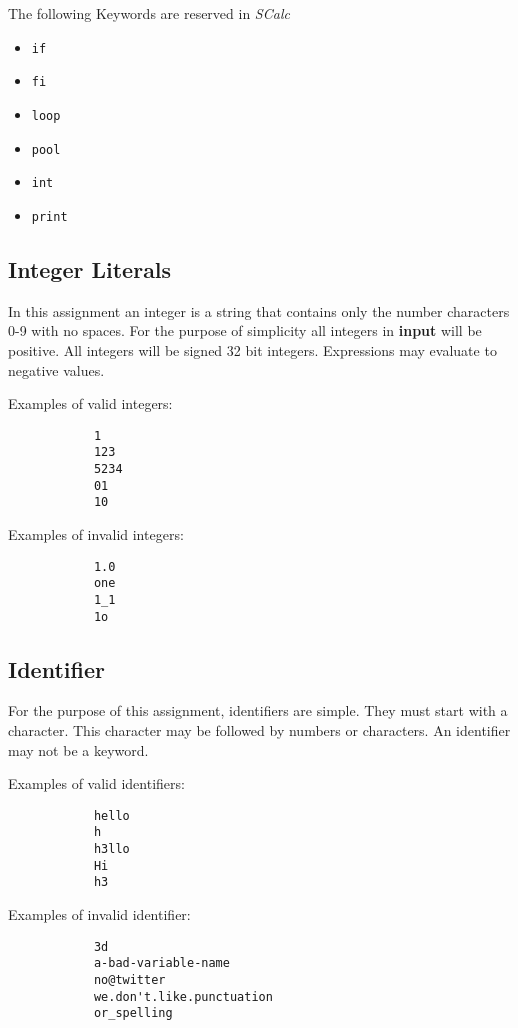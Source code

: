 \documentclass{article}
\newcommand{\code}[1]{\texttt{\textmd{#1}}}
\begin{document}
		The following Keywords are reserved in \textit{SCalc}

		\begin {itemize}
			\item{\code{if}}
			\item{\code{fi}}
			\item{\code{loop}}
			\item{\code{pool}}
			\item{\code{int}}
			\item{\code{print}}
		\end {itemize}


	\subsection {Integer Literals}

		In this assignment an integer is a string that contains only the number characters 0-9 with no
		spaces. For the purpose of simplicity all integers in \textbf{input} will be positive. All integers will be
		signed 32 bit integers. Expressions may evaluate to negative values.

		Examples of valid integers:

		\begin{lstlisting}
			1
			123
			5234
			01
			10
		\end{lstlisting}

		Examples of invalid integers:

		\begin{lstlisting}
			1.0
			one
			1_1
			1o
		\end{lstlisting}


	\subsection{Identifier}

		For the purpose of this assignment, identifiers are simple. They must start with a character. This character may be followed by
		numbers or characters. An identifier may not be a keyword.

		Examples of valid identifiers:

		\begin{lstlisting}
			hello
			h
			h3llo
			Hi
			h3
		\end{lstlisting}

		Examples of invalid identifier:

		\begin{lstlisting}
			3d
			a-bad-variable-name
			no@twitter
			we.don't.like.punctuation
			or_spelling
		\end{lstlisting}
\end{document}
